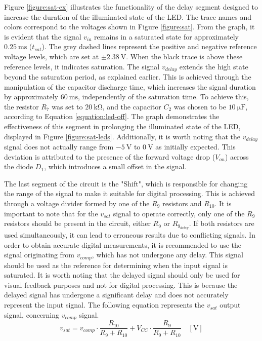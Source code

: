 Figure \ref{figure:sat-ex} illustrates the functionality of the delay segment designed to increase the duration of the illuminated state of the \ac{LED}. The trace names and colors correspond to the voltages shown in Figure \ref{figure:sat}. From the graph, it is evident that the signal $v_{ia}$ remains in a saturated state for approximately $\mathrm{0.25~ms}$ ($t_{sat}$). The grey dashed lines represent the positive and negative reference voltage levels, which are set at $\mathrm{\pm 2.38~V}$. When the black trace is above these reference levels, it indicates saturation. The signal $v_{delay}$ extends the high state beyond the saturation period, as explained earlier. This is achieved through the manipulation of the capacitor discharge time, which increases the signal duration by approximately $\mathrm{60~ms}$, independently of the saturation time. To achieve this, the resistor $R_7$ was set to $\mathrm{20~k\Omega}$, and the capacitor $C_2$ was chosen to be $\mathrm{10~\mu F}$, according to Equation \ref{equation:led-off}. The graph demonstrates the effectiveness of this segment in prolonging the illuminated state of the \ac{LED}, displayed in Figure \ref{figure:sat-leds}. Additionally, it is worth noting that the $v_{delay}$ signal does not actually range from $\mathrm{-5~V}$ to $\mathrm{0~V}$ as initially expected. This deviation is attributed to the presence of the forward voltage drop ($V_{on}$) across the diode $D_1$, which introduces a small offset in the signal.

The last segment of the circuit is the "Shift", which is responsible for changing the range of the signal to make it suitable for digital processing. This is achieved through a voltage divider formed by one of the $R_9$ resistors and $R_{10}$. It is important to note that for the $v_{sat}$ signal to operate correctly, only one of the $R_9$ resistors should be present in the circuit, either $R_9$ or $R_{9_{delay}}$. If both resistors are used simultaneously, it can lead to erroneous results due to conflicting signals. In order to obtain accurate digital measurements, it is recommended to use the signal originating from $v_{comp}$, which has not undergone any delay. This signal should be used as the reference for determining when the input signal is saturated. It is worth noting that the delayed signal should only be used for visual feedback purposes and not for digital processing. This is because the delayed signal has undergone a significant delay and does not accurately represent the input signal. The following equation represents the $v_{sat}$ output signal, concerning $v_{comp}$ signal.
\begin{equation}
    v_{sat} = v_{comp} \cdot \frac{R_{10}}{R_{9}+R_{10}} + V_{CC} \cdot \frac{R_{9}}{R_{9}+R_{10}} \quad [\mathrm{V}]
    \label{equation:sat-vsat}
\end{equation}


